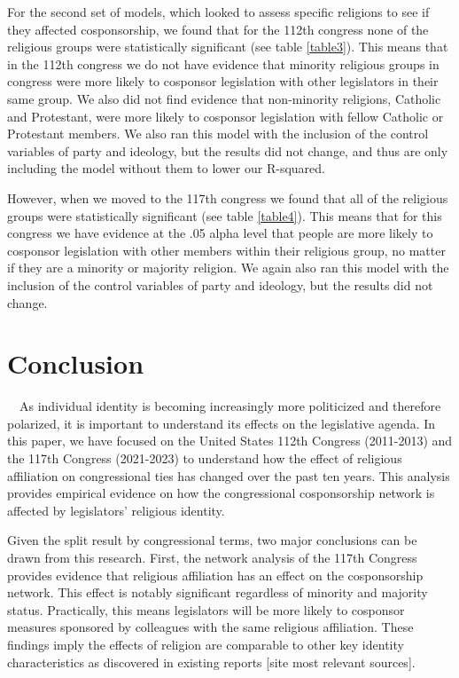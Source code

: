 \documentclass[Royal,times,sageh]{sagej}
\begin{document}
For the second set of models, which looked to assess specific religions
to see if they affected cosponsorship, we found that for the 112th
congress none of the religious groups were statistically significant
(see table \ref{table3}). This means that in the 112th congress we do
not have evidence that minority religious groups in congress were more
likely to cosponsor legislation with other legislators in their same
group. We also did not find evidence that non-minority religions,
Catholic and Protestant, were more likely to cosponsor legislation with
fellow Catholic or Protestant members. We also ran this model with the
inclusion of the control variables of party and ideology, but the
results did not change, and thus are only including the model without
them to lower our R-squared.

However, when we moved to the 117th congress we found that all of the
religious groups were statistically significant (see table
\ref{table4}). This means that for this congress we have evidence at the
.05 alpha level that people are more likely to cosponsor legislation
with other members within their religious group, no matter if they are a
minority or majority religion. We again also ran this model with the
inclusion of the control variables of party and ideology, but the
results did not change.

\hypertarget{conclusion}{%
\section{Conclusion}\label{conclusion}}

~~As individual identity is becoming increasingly more politicized and
therefore polarized, it is important to understand its effects on the
legislative agenda. In this paper, we have focused on the United States
112th Congress (2011-2013) and the 117th Congress (2021-2023) to
understand how the effect of religious affiliation on congressional ties
has changed over the past ten years. This analysis provides empirical
evidence on how the congressional cosponsorship network is affected by
legislators' religious identity.

Given the split result by congressional terms, two major conclusions can
be drawn from this research. First, the network analysis of the 117th
Congress provides evidence that religious affiliation has an effect on
the cosponsorship network. This effect is notably significant regardless
of minority and majority status. Practically, this means legislators
will be more likely to cosponsor measures sponsored by colleagues with
the same religious affiliation. These findings imply the effects of
religion are comparable to other key identity characteristics as
discovered in existing reports {[}site most relevant sources{]}.
\end{document}
